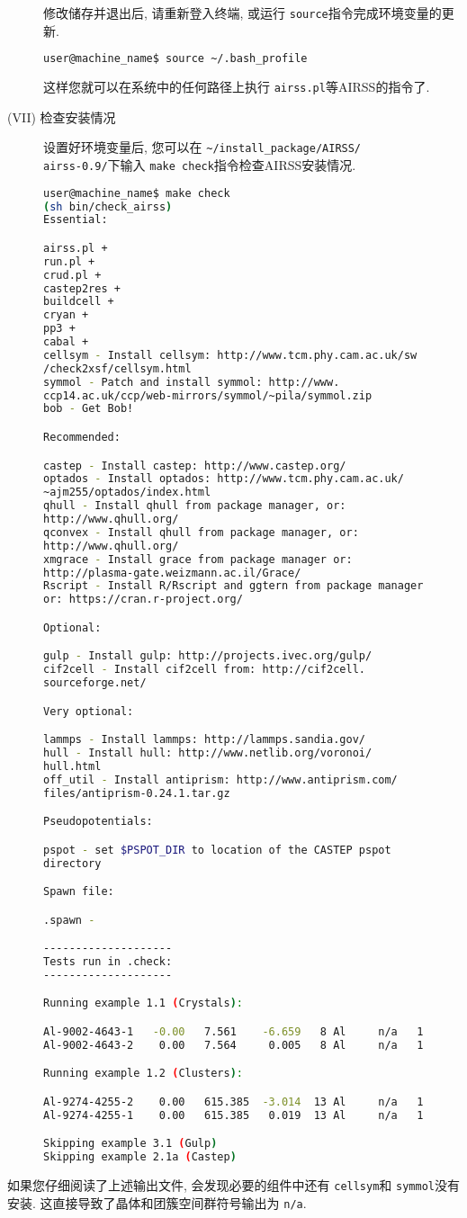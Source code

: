 \documentclass[a4paper, 10pt]{article}
\begin{document}
\begin{description}
修改储存并退出后, 请重新登入终端, 或运行 \verb|source|指令完成环境变量的更新.
\begin{lstlisting}[language={bash}]
user@machine_name$ source ~/.bash_profile 
\end{lstlisting}

这样您就可以在系统中的任何路径上执行 \verb|airss.pl|等AIRSS的指令了.

\item[(VII) 检查安装情况] 设置好环境变量后, 您可以在 \verb|~/install_package/AIRSS/|
\\ \verb|airss-0.9/|下输入 \verb|make check|指令检查AIRSS安装情况. 
\begin{lstlisting}[language={bash}]
user@machine_name$ make check
(sh bin/check_airss)
Essential:

airss.pl +
run.pl +
crud.pl +
castep2res +
buildcell +
cryan +
pp3 +
cabal +
cellsym - Install cellsym: http://www.tcm.phy.cam.ac.uk/sw
/check2xsf/cellsym.html
symmol - Patch and install symmol: http://www.
ccp14.ac.uk/ccp/web-mirrors/symmol/~pila/symmol.zip
bob - Get Bob!

Recommended:

castep - Install castep: http://www.castep.org/
optados - Install optados: http://www.tcm.phy.cam.ac.uk/
~ajm255/optados/index.html
qhull - Install qhull from package manager, or: 
http://www.qhull.org/
qconvex - Install qhull from package manager, or: 
http://www.qhull.org/
xmgrace - Install grace from package manager or: 
http://plasma-gate.weizmann.ac.il/Grace/
Rscript - Install R/Rscript and ggtern from package manager
or: https://cran.r-project.org/

Optional:

gulp - Install gulp: http://projects.ivec.org/gulp/
cif2cell - Install cif2cell from: http://cif2cell.
sourceforge.net/

Very optional:

lammps - Install lammps: http://lammps.sandia.gov/
hull - Install hull: http://www.netlib.org/voronoi/
hull.html
off_util - Install antiprism: http://www.antiprism.com/
files/antiprism-0.24.1.tar.gz

Pseudopotentials:

pspot - set $PSPOT_DIR to location of the CASTEP pspot 
directory

Spawn file:

.spawn - 

--------------------
Tests run in .check:
--------------------

Running example 1.1 (Crystals):

Al-9002-4643-1   -0.00   7.561    -6.659   8 Al     n/a   1
Al-9002-4643-2    0.00   7.564     0.005   8 Al     n/a   1

Running example 1.2 (Clusters):

Al-9274-4255-2    0.00   615.385  -3.014  13 Al     n/a   1
Al-9274-4255-1    0.00   615.385   0.019  13 Al     n/a   1

Skipping example 3.1 (Gulp)
Skipping example 2.1a (Castep)
\end{lstlisting}       
\end{description}
如果您仔细阅读了上述输出文件, 会发现必要的组件中还有 \verb|cellsym|和 \verb|symmol|没有安装. 这直接导致了晶体和团簇空间群符号输出为 \verb|n/a|. 
\end{document}
